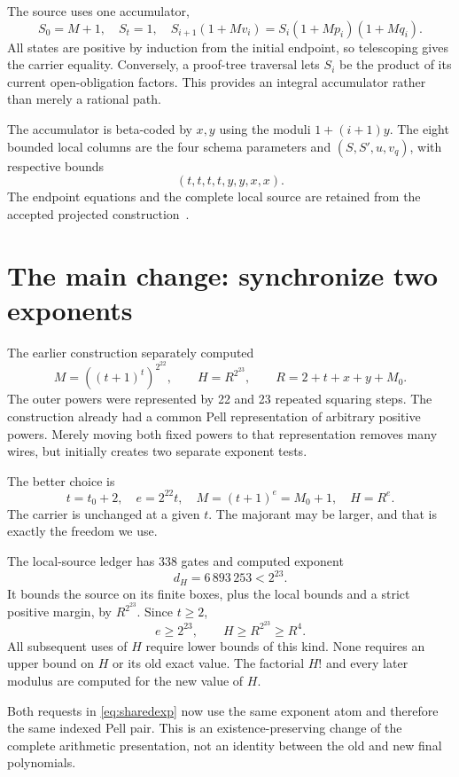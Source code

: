 \documentclass[11pt]{article}
\theoremstyle{definition}\newtheorem{definition}[theorem]{Definition}
\begin{document}
The source uses one accumulator,
\[
 S_0=M+1,\quad S_t=1,\quad
 S_{i+1}(1+Mv_i)=S_i(1+Mp_i)(1+Mq_i).
\]
All states are positive by induction from the initial endpoint, so
telescoping gives the carrier equality. Conversely, a proof-tree traversal
lets $S_i$ be the product of its current open-obligation factors. This
provides an integral accumulator rather than merely a rational path.

The accumulator is beta-coded by $x,y$ using the moduli $1+(i+1)y$.
The eight bounded local columns are the four schema parameters and
$(S,S',u,v_q)$, with respective bounds
\[
 (t,t,t,t,y,y,x,x).
\]
The endpoint equations and the complete local source are retained from
the accepted projected construction~\cite{parent407,parent399}.

\section{The main change: synchronize two exponents}
The earlier construction separately computed
\[
 M=((t+1)^t)^{2^{22}},\qquad H=R^{2^{23}},\qquad
 R=2+t+x+y+M_0.
\]
The outer powers were represented by 22 and 23 repeated squaring steps.
The construction already had a common Pell representation of arbitrary
positive powers. Merely moving both fixed powers to that representation
removes many wires, but initially creates two separate exponent tests.

The better choice is
\begin{equation}\label{eq:sharedexp}
 \boxed{t=t_0+2,\quad e=2^{22}t,\quad
 M=(t+1)^e=M_0+1,\quad H=R^e.}
\end{equation}
The carrier is unchanged at a given $t$. The majorant may be larger,
and that is exactly the freedom we use.

The local-source ledger has 338 gates and computed exponent
\[
 d_H=6\,893\,253<2^{23}.
\]
It bounds the source on its finite boxes, plus the local bounds and a
strict positive margin, by $R^{2^{23}}$. Since $t\ge2$,
\[
 e\ge2^{23},\qquad H\ge R^{2^{23}}\ge R^4.
\]
All subsequent uses of $H$ require lower bounds of this kind. None
requires an upper bound on $H$ or its old exact value. The factorial
$H!$ and every later modulus are computed for the new value of $H$.

Both requests in \eqref{eq:sharedexp} now use the same exponent atom and
therefore the same indexed Pell pair. This is an existence-preserving
change of the complete arithmetic presentation, not an identity between
the old and new final polynomials.
\end{document}
